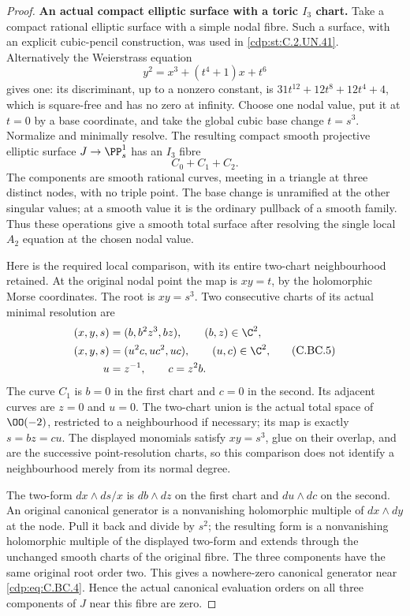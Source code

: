 \begin{proof}
\par\medskip\noindent\textbf{An actual compact elliptic surface with a toric \(I_3\) chart.}
Take a compact rational elliptic surface with a simple nodal fibre.
Such a surface, with an explicit cubic-pencil construction, was
used in \ref{cdp:st:C.2.UN.41}. Alternatively the Weierstrass equation
\[
       y^2=x^3+(t^4+1)x+t^6                         \tag{C.BC.3}\label{cdp:eq:C.BC.3}
\]
gives one: its discriminant, up to a nonzero constant, is
\(31t^{12}+12t^8+12t^4+4\), which is square-free and has no
zero at infinity. Choose one nodal value, put it at \(t=0\)
by a base coordinate, and take the global cubic base change
\(t=s^3\). Normalize and minimally resolve. The resulting
compact smooth projective elliptic surface \(J\to\PP^1_s\)
has an \(I_3\) fibre
\[
                         C_0+C_1+C_2 .             \tag{C.BC.4}\label{cdp:eq:C.BC.4}
\]
The components are smooth rational curves, meeting in a triangle
at three distinct nodes, with no triple point. The base change
is unramified at the other singular values; at a smooth value
it is the ordinary pullback of a smooth family. Thus these
operations give a smooth total surface after resolving the
single local \(A_2\) equation at the chosen nodal value.

Here is the required local comparison, with its entire two-chart
neighbourhood retained. At the original nodal point the map is
\(xy=t\), by the holomorphic Morse coordinates. The root is
\(xy=s^3\). Two consecutive charts of its actual minimal
resolution are
\[
 \begin{aligned}
 (x,y,s)&=(b,b^2z^3,bz),\qquad (b,z)\in\C^2,\\
 (x,y,s)&=(u^2c,uc^2,uc),\qquad (u,c)\in\C^2,\\
                 u&=z^{-1},\qquad c=z^2b .
 \end{aligned}                                             \tag{C.BC.5}\label{cdp:eq:C.BC.5}
\]
The curve \(C_1\) is \(b=0\) in the first chart and
\(c=0\) in the second. Its adjacent curves are \(z=0\)
and \(u=0\). The two-chart union is the actual total space
of \(\OO(-2)\), restricted to a neighbourhood if necessary;
its map is exactly \(s=bz=cu\).
The displayed monomials satisfy \(xy=s^3\), glue on their
overlap, and are the successive point-resolution charts,
so this comparison does not identify a neighbourhood merely
from its normal degree.

The two-form \(dx\wedge ds/x\) is \(db\wedge dz\)
on the first chart and \(du\wedge dc\) on the second.
An original canonical generator is a nonvanishing
holomorphic multiple of \(dx\wedge dy\) at the node.
Pull it back and divide by \(s^2\); the resulting
form is a nonvanishing holomorphic multiple of the
displayed two-form and extends through the unchanged
smooth charts of the original fibre. The three
components have the same original root order two.
This gives a nowhere-zero canonical generator
near \eqref{cdp:eq:C.BC.4}. Hence the actual
canonical evaluation orders on all three components of
\(J\) near this fibre are zero.


\end{proof}
